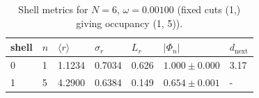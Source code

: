 \begin{table}[t]
\centering
\small
\setlength{\tabcolsep}{4pt}
\renewcommand{\arraystretch}{1.15}
\begin{tabular}{lllllll}
\toprule
\textbf{shell} & $n$ & $\langle r\rangle$ & $\sigma_r$ & $L_r$ & $|\Phi_n|$ & $d_{\mathrm{next}}$ \\
\midrule
0 & 1 & 1.1234 & 0.7034 & 0.626 & $1.000\pm 0.000$ & 3.17 \\
1 & 5 & 4.2900 & 0.6384 & 0.149 & $0.654\pm 0.001$ & - \\
\bottomrule
\end{tabular}
\caption{Shell metrics for $N=6$, $\omega=0.00100$ (fixed cuts (1,) giving occupancy (1, 5)).}
\label{tab:shells_N6_omega0p00100}
\end{table}